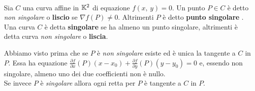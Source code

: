 \begin{define}~{}\\
	Sia $C$ una curva affine in $\mathbb{K}^2$ di equazione $f\left(x,\ y\right)=0$. Un punto $P\in C$ è detto \textit{non singolare} o \textbf{liscio} se $\nabla f\left(P\right)\neq 0$. Altrimenti $P$ è detto \textbf{punto singolare} .\\
	Una curva $C$ è detta \textbf{singolare} se ha almeno un punto singolare, altrimenti è detta curva \textit{non singolare} o \textbf{liscia}.
\end{define}
Abbiamo visto prima che se $P$ è \textit{non singolare} esiste ed è unica la tangente a $C$ in $P$. Essa ha equazione	$\frac{\partial{f}}{\partial{x}}\left(P\right)(x-x_0) + \frac{\partial{f}}{\partial{y}} \left(P\right)(y-y_0)=0$ e, essendo non singolare, almeno uno dei due coefficienti non è nullo.\\
Se invece $P$ è \textit{singolare} allora ogni retta per $P$ è tangente a $C$ in $P$.
